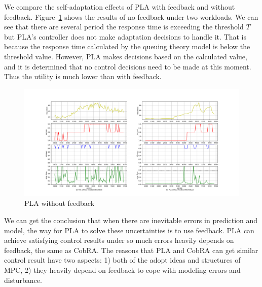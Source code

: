 \documentclass[sigconf]{acmart}
\begin{document}
We compare the self-adaptation effects of PLA with feedback and without feedback. Figure~\ref{nokalman} shows the results of no feedback under two workloads. We can see that there are several period the response time is exceeding the threshold $T$ but PLA's controller does not make adaptation decisions to handle it. That is because the response time calculated by the queuing theory model is below the threshold value. However, PLA makes decisions based on the calculated value, and it is determined that no control decisions need to be made at this moment. Thus the utility is much lower than with feedback.
\begin{figure}[h]
	\centering
	\includegraphics[width=\linewidth]{nokalman}
	\caption{PLA without feedback}
	\label{nokalman}
\end{figure}
We can get the conclusion that when there are inevitable errors in prediction and model, the way for PLA to solve these uncertainties is to use feedback. PLA can achieve satisfying control results under so much errors heavily depends on feedback, the same as CobRA.
The reasons that PLA and CobRA can get similar control result have two aspects: 1) both of the adopt ideas and structures of MPC, 2) they heavily depend on feedback to cope with modeling errors and disturbance.
\end{document}
